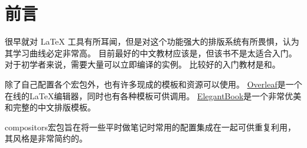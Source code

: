 \chapter{前言}

很早就对 {\LaTeX} 工具有所耳闻，但是对这个功能强大的排版系统有所畏惧，认为其学习曲线必定非常高。
目前最好的中文教材应该是\cite{LIU13}，但该书不是太适合入门。 对于初学者来说，需要大量可以立即编译的实例。 
比较好的入门教材是\cite{SK11}和\cite{SK15}。

除了自己配置各个宏包外，也有许多现成的模板和资源可以使用。
\href{https://www.overleaf.com}{Overleaf}是一个在线的{\LaTeX}编辑器，同时也有各种模板可供调用。
\href{https://github.com/ElegantLaTeX/ElegantBook}{ElegantBook}是一个非常优美和完整的中文排版模板。

compositors宏包旨在将一些平时做笔记时常用的配置集成在一起可供重复利用，其风格是非常简约的。
